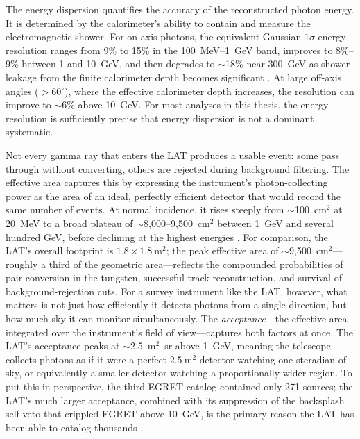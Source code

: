 The energy dispersion quantifies the accuracy of the reconstructed photon energy.
It is determined by the calorimeter's ability to contain and measure the electromagnetic shower.
For on-axis photons, the equivalent Gaussian $1\sigma$ energy resolution ranges from 9\% to 15\% in the 100~MeV--1~GeV band, improves to 8\%--9\% between 1 and 10~GeV, and then degrades to $\sim$18\% near 300~GeV as shower leakage from the finite calorimeter depth becomes significant \cite{Atwood:2009ez}.
At large off-axis angles ($>60^\circ$), where the effective calorimeter depth increases, the resolution can improve to $\sim$6\% above 10~GeV.
For most analyses in this thesis, the energy resolution is sufficiently precise that energy dispersion is not a dominant systematic.

Not every gamma ray that enters the LAT produces a usable event: some pass through without converting, others are rejected during background filtering.
The effective area captures this by expressing the instrument's photon-collecting power as the area of an ideal, perfectly efficient detector that would record the same number of events.
At normal incidence, it rises steeply from $\sim$100~cm$^2$ at 20~MeV to a broad plateau of $\sim$8,000--9,500~cm$^2$ between 1~GeV and several hundred GeV, before declining at the highest energies \cite{Atwood:2009ez}.
For comparison, the LAT's overall footprint is $1.8 \times 1.8~\mathrm{m}^2$; the peak effective area of $\sim$9,500~cm$^2$---roughly a third of the geometric area---reflects the compounded probabilities of pair conversion in the tungsten, successful track reconstruction, and survival of background-rejection cuts.
For a survey instrument like the LAT, however, what matters is not just how efficiently it detects photons from a single direction, but how much sky it can monitor simultaneously.
The \emph{acceptance}---the effective area integrated over the instrument's field of view---captures both factors at once.
The LAT's acceptance peaks at $\sim$2.5~m$^2$~sr above 1~GeV, meaning the telescope collects photons as if it were a perfect $2.5~\mathrm{m}^2$ detector watching one steradian of sky, or equivalently a smaller detector watching a proportionally wider region.
To put this in perspective, the third EGRET catalog contained only 271 sources; the LAT's much larger acceptance, combined with its suppression of the backsplash self-veto that crippled EGRET above 10~GeV, is the primary reason the LAT has been able to catalog thousands \cite{Atwood:2009ez}.

